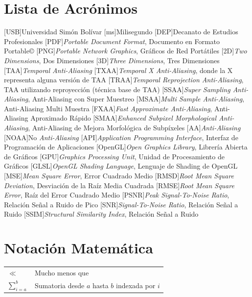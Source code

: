 \documentclass[pregrado]{tesis-usb} %
\begin{document}
\tableofcontents
\listoffigures
\listoftables

\chapter*{Lista de Acrónimos}
\begin{acronym}
	[USB]{Universidad Sim\'on Bol\'ivar}
	[ms]{Milisegundo}
	[DEP]{Decanato de Estudios Profesionales}
	[PDF]{\textit{Portable Document Format}, Documento en Formato Portable\copyright}
	[PNG]{\textit{Portable Network Graphics}, Gráficos de Red Portátiles}
	[2D]{\textit{Two Dimensions}, Dos Dimensiones}
	[3D]{\textit{Three Dimensions}, Tres Dimensiones}
	[TAA]{\textit{Temporal Anti-Aliasing}}
	[TXAA]{\textit{Temporal X Anti-Aliasing}, donde la X representa alguna versión de TAA}
	[TRAA]{\textit{Temporal Reprojection Anti-Aliasing}, TAA utilizando reproyección (técnica base de TAA)}
	[SSAA]{\textit{Super Sampling Anti-Aliasing}, Anti-Aliasing con Super Muestreo}
	[MSAA]{\textit{Multi Sample Anti-Aliasing}, Anti-Aliasing Multi Muestra}
	[FXAA]{\textit{Fast Approximate Anti-Aliasing}, Anti-Aliasing Aproximado Rápido}
	[SMAA]{\textit{Enhanced Subpixel Morphological Anti-Aliasing}, Anti-Aliasing de Mejora Morfológica de Subpíxeles}
	[AA]{\textit{Anti-Aliasing}}
	[NOAA]{No \textit{Anti-Aliasing}}
	[API]{\textit{Application Programming Interface}, Interfaz de Programación de Aplicaciones}
	[OpenGL]{\textit{Open Graphics Library}, Librería Abierta de Gráficos}
	[GPU]{\textit{Graphics Processing Unit}, Unidad de Procesamiento de Gráficos}
	[GLSL]{\textit{OpenGL Shading Language}, Lenguaje de Shading de OpenGL}
	[MSE]{\textit{Mean Square Error}, Error Cuadrado Medio}
	[RMSD]{\textit{Root Mean Square Deviation}, Desviación de la Raíz Media Cuadrada}
	[RMSE]{\textit{Root Mean Square Error}, Raíz del Error Cuadrado Medio}
	[PSNR]{\textit{Peak Signal-To-Noise Ratio}, Relación Señal a Ruido de Pico}
	[SNR]{\textit{Signal-To-Noise Ratio}, Relación Señal a Ruido}
	[SSIM]{\textit{Structural Similarity Index}, Relación Señal a Ruido}

\end{acronym}
\clearpage

\chapter*{Notación Matemática}
\begin{tabular}{ll}
	$\ll$ & Mucho menos que\\
	$\sum\limits_{i=a}^{b}$ & Sumatoria desde $a$ hasta $b$ indexada por $i$ 
\end{tabular}
\end{document}
